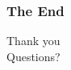\documentclass[hyperref={pdfpagelabels=false}]{beamer}
\begin{document}
\begin{frame}[plain]\frametitle{The End}
\centering
\Huge
Thank you\\
Questions?
\end{frame}




\end{document}
